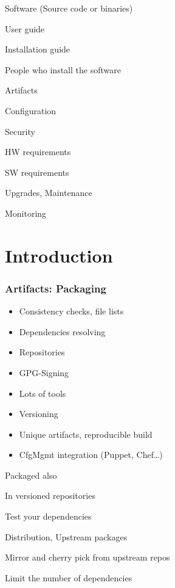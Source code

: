 \begin{iframe}[Distribution]
\item Software (Source code or binaries)
\item User guide
\item Installation guide
\item People who install the software
\end{iframe}

\begin{iframe}
\item Artifacts
\item Configuration
\item Security
\item HW requirements
\item SW requirements
\item Upgrades, Maintenance
\item Monitoring
\end{iframe}


\section{Introduction}
\begin{frame}
    \frametitle{Artifacts: Packaging}
    \begin{itemize}
        \item {Consistency checks, file lists}
        \item {Dependencies resolving}
        \item {Repositories}
        \item {GPG-Signing}
        \item {Lots of tools}
        \item {Versioning}
        \item {Unique artifacts, reproducible build}
        \item {CfgMgmt integration (Puppet, Chef\dots)}
    \end{itemize}
\end{frame}

\begin{iframe}[Dependencies]
\item{Packaged also}
\item{In versioned repositories}
\item{Test your dependencies}
\item{Distribution, Upstream packages}
\item{Mirror and cherry pick from upstream repos}
\item{Limit the number of dependencies}
\end{iframe}


